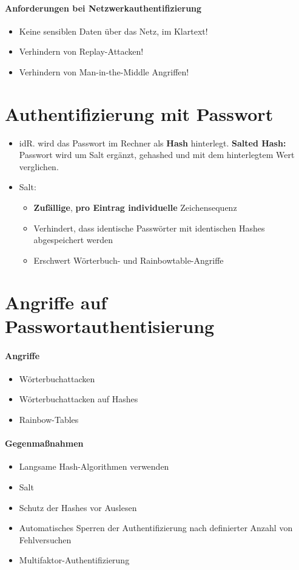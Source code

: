 \paragraph{Anforderungen bei Netzwerkauthentifizierung}
\begin{itemize}
	\item Keine sensiblen Daten über das Netz, im Klartext!
	\item Verhindern von Replay-Attacken!
	\item Verhindern von Man-in-the-Middle Angriffen!
\end{itemize}

\section{Authentifizierung mit Passwort}
\begin{itemize}
	\item idR. wird das Passwort im Rechner als \textbf{Hash} hinterlegt.
	\textbf{Salted Hash:} Passwort wird um Salt ergänzt, gehashed und mit dem hinterlegtem Wert verglichen.
	\item Salt:
	\begin{itemize}
	\item \textbf{Zufällige}, \textbf{pro Eintrag individuelle} Zeichensequenz
	\item Verhindert, dass identische Passwörter mit identischen Hashes abgespeichert werden
	\item Erschwert Wörterbuch- und Rainbowtable-Angriffe
	\end{itemize}
\end{itemize}

\section{Angriffe auf Passwortauthentisierung}
\paragraph{Angriffe}
\begin{itemize}
	\item Wörterbuchattacken
	\item Wörterbuchattacken auf Hashes
	\item Rainbow-Tables
\end{itemize}

\paragraph{Gegenmaßnahmen}
\begin{itemize}
	\item Langsame Hash-Algorithmen verwenden
	\item Salt
	\item Schutz der Hashes vor Auslesen
	\item Automatisches Sperren der Authentifizierung nach definierter Anzahl von Fehlversuchen
	\item Multifaktor-Authentifizierung 
\end{itemize}

